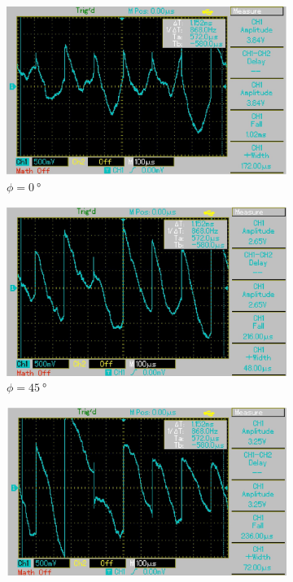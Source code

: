 \begin{figure}[H]
  \centering
  \begin{subfigure}{0.3\textwidth}
      \centering
      \includegraphics[width=\textwidth]{build/n0.jpg}
      \caption{$\phi = \SI{0}{\degree}$}
  \end{subfigure}
  \begin{subfigure}{0.3\textwidth}
    \centering
    \includegraphics[width=\textwidth]{build/n45.jpg}
    \caption{$\phi = \SI{45}{\degree}$}
  \end{subfigure}
  \begin{subfigure}{0.3\textwidth}
    \centering
    \includegraphics[width=\textwidth]{build/n90.jpg}

\end{subfigure}
\end{figure}
